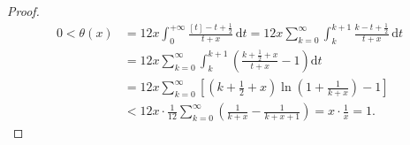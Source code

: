 \begin{proof}
\[
  \begin{aligned}
    0<\theta(x)&=12x\int_{0}^{+\infty}\frac{[t]-t+\frac{1}{2}}{t+x}\,\mathrm{d}t=12x\sum_{k=0}^{\infty}\int_{k}^{k+1}\frac{k-t+\frac{1}{2}}{t+x}\,\mathrm{d}t\\
    &=12x\sum_{k=0}^{\infty}\int_{k}^{k+1}\left(\frac{k+\frac{1}{2}+x}{t+x}-1\right)\mathrm{d}t\\
    &=12x\sum_{k=0}^{\infty}\left[\left(k+\frac{1}{2}+x\right)\ln\left(1+\frac{1}{k+x}\right)-1\right]\\
    &<12x\cdot\frac{1}{12}\sum_{k=0}^{\infty}\left(\frac{1}{k+x}-\frac{1}{k+x+1}\right)=x\cdot\frac{1}{x}=1.
  \end{aligned}
\]
\end{proof}


